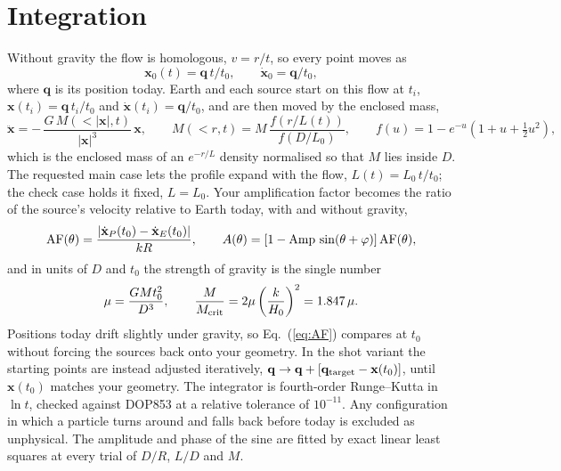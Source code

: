 \documentclass[10pt,letterpaper]{article}
\begin{document}
\section{Integration}
Without gravity the flow is homologous, $v=r/t$, so every point moves as
\begin{equation}\label{eq:flow}
\mathbf{x}_0(t)=\mathbf{q}\,t/t_0,\qquad \dot{\mathbf{x}}_0=\mathbf{q}/t_0,
\end{equation}
where $\mathbf{q}$ is its position today. Earth and each source start on this flow at $t_i$, $\mathbf{x}(t_i)=\mathbf{q}\,t_i/t_0$ and $\dot{\mathbf{x}}(t_i)=\mathbf{q}/t_0$, and are then moved by the enclosed mass,
\begin{equation}\label{eq:eom}
\ddot{\mathbf{x}}=-\,\frac{G\,M(<|\mathbf{x}|,t)}{|\mathbf{x}|^{3}}\,\mathbf{x},\qquad
M(<r,t)=M\,\frac{f\!\left(r/L(t)\right)}{f\!\left(D/L_0\right)},\qquad f(u)=1-e^{-u}\left(1+u+\tfrac12u^2\right),
\end{equation}
which is the enclosed mass of an $e^{-r/L}$ density normalised so that $M$ lies inside $D$. The requested main case lets the profile expand with the flow, $L(t)=L_0\,t/t_0$; the check case holds it fixed, $L=L_0$. Your amplification factor becomes the ratio of the source's velocity relative to Earth today, with and without gravity,
\begin{equation}\label{eq:AF}
{\rm AF}(\theta)=\frac{\left|\dot{\mathbf{x}}_P(t_0)-\dot{\mathbf{x}}_E(t_0)\right|}{kR},\qquad
A(\theta)=\left[1-{\rm Amp}\,\sin(\theta+\varphi)\right]{\rm AF}(\theta),
\end{equation}
and in units of $D$ and $t_0$ the strength of gravity is the single number
\begin{equation}\label{eq:mu}
\mu=\frac{G M t_0^2}{D^3},\qquad \frac{M}{M_{\rm crit}}=2\mu\left(\frac{k}{H_0}\right)^{2}=1.847\,\mu .
\end{equation}
Positions today drift slightly under gravity, so Eq.~(\ref{eq:AF}) compares at $t_0$ without forcing the sources back onto your geometry. In the shot variant the starting points are instead adjusted iteratively, $\mathbf{q}\to\mathbf{q}+[\mathbf{q}_{\rm target}-\mathbf{x}(t_0)]$, until $\mathbf{x}(t_0)$ matches your geometry. The integrator is fourth-order Runge--Kutta in $\ln t$, checked against DOP853 at a relative tolerance of $10^{-11}$. Any configuration in which a particle turns around and falls back before today is excluded as unphysical. The amplitude and phase of the sine are fitted by exact linear least squares at every trial of $D/R$, $L/D$ and $M$.
\end{document}
